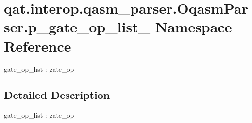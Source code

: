 \hypertarget{namespaceqat_1_1interop_1_1qasm__parser_1_1OqasmParser_1_1p__gate__op__list__0}{\section{qat.\-interop.\-qasm\-\_\-parser.\-Oqasm\-Parser.\-p\-\_\-gate\-\_\-op\-\_\-list\-\_ Namespace Reference}
\label{namespaceqat_1_1interop_1_1qasm__parser_1_1OqasmParser_1_1p__gate__op__list__0}
}


gate\-\_\-op\-\_\-list \-: gate\-\_\-op  




\subsection{Detailed Description}
gate\-\_\-op\-\_\-list \-: gate\-\_\-op 